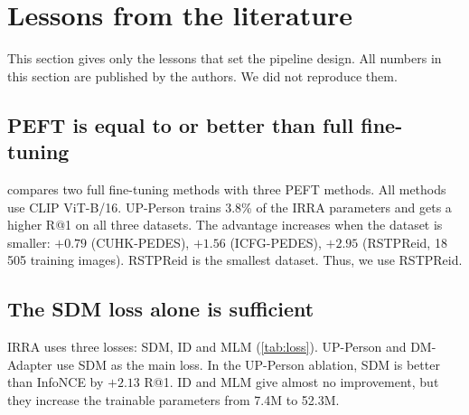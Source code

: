 \section{Lessons from the literature}\label{sec:lit}

This section gives only the lessons that set the pipeline design. All numbers in this section are published by the authors. We did not reproduce them.

\subsection{PEFT is equal to or better than full fine-tuning}
 compares two full fine-tuning methods with three PEFT methods. All methods use CLIP ViT-B/16. UP-Person trains 3.8\% of the IRRA parameters and gets a higher R@1 on all three datasets. The advantage increases when the dataset is smaller: $+0.79$ (CUHK-PEDES), $+1.56$ (ICFG-PEDES), $+2.95$ (RSTPReid, 18\,505 training images). RSTPReid is the smallest dataset. Thus, we use RSTPReid.

\begin{table}[t]
\centering\small
\caption{Full fine-tuning and PEFT on CLIP ViT-B/16: published R@1 (\%). Source: \texttt{docs/benchmark-baseline.md}.}\label{tab:ftvspeft}
\end{table}

\subsection{The SDM loss alone is sufficient}
IRRA uses three losses: SDM, ID and MLM (\cref{tab:loss}). UP-Person and DM-Adapter use SDM as the main loss. In the UP-Person ablation, SDM is better than InfoNCE by $+2.13$ R@1. ID and MLM give almost no improvement, but they increase the trainable parameters from 7.4M to 52.3M.

